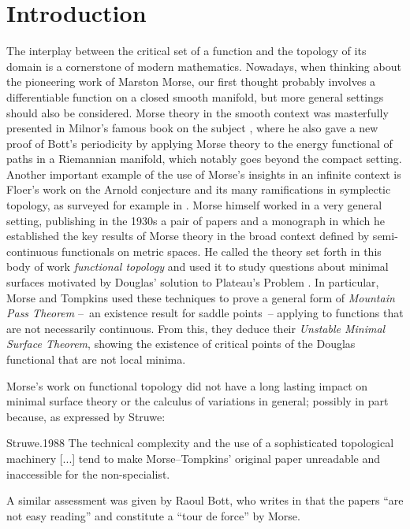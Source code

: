 
\section{Introduction}

The interplay between the critical set of a function and the topology of its domain is a cornerstone of modern mathematics.
Nowadays, when thinking about the pioneering work of Marston Morse, our first thought probably involves a differentiable function on a closed smooth manifold, but more general settings should also be considered.
Morse theory in the smooth context was masterfully presented in Milnor's famous book on the subject \cite{Milnor.1963}, where he also gave a new proof of Bott's periodicity by applying Morse theory to the energy functional of paths in a Riemannian manifold, which notably goes beyond the compact setting.
Another important example of the use of Morse's insights in an infinite context is Floer's work on the Arnold conjecture and its many ramifications in symplectic topology, as surveyed for example in \cite{Salamon.1999}.
Morse himself worked in a very general setting, publishing in the 1930s a pair of papers \cite{Morse.1937, Morse.1940} and a monograph \cite{Morse.1938} in which he established the key results of Morse theory in the broad context defined by semi-continuous functionals on metric spaces.
He called the theory set forth in this body of work \emph{functional topology} and used it to study questions about minimal surfaces motivated by Douglas' solution to Plateau’s Problem \cite{Douglas.1931}.
In particular, Morse and Tompkins \cite{Morse.1939, Morse.1941} used these techniques to prove a general form of \emph{Mountain Pass Theorem} --~an existence result for saddle points~-- applying to functions that are not necessarily continuous.
From this, they deduce their \emph{Unstable Minimal Surface Theorem}, showing the existence of critical points of the Douglas functional that are not local minima.

Morse's work on functional topology did not have a long lasting impact on minimal surface theory or the calculus of variations in general; possibly in part because, as expressed by Struwe:
\begin{displaycquote}[p.~82]{Struwe.1988}
    The technical complexity and the use of a sophisticated topological machinery [...] tend to make Morse--Tompkins' original paper unreadable and inaccessible for the non-specialist.
\end{displaycquote}
A similar assessment was given by Raoul Bott, who writes in \cite[p.~934]{Bott.1980} that the papers \cite{Morse.1937, Morse.1940} ``are not easy reading'' and constitute a ``tour de force'' by Morse.

